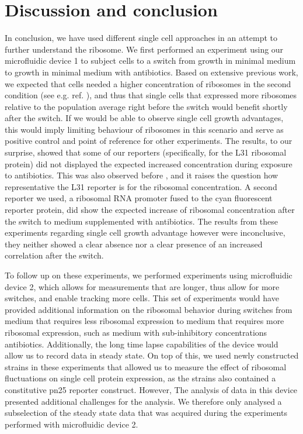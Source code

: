 \section{Discussion and conclusion}

In conclusion, we have used different single cell approaches in an attempt to further understand the ribosome.
%
We first performed an experiment using our microfluidic device 1 to subject cells to a switch from growth in minimal medium to growth in minimal medium with antibiotics.
Based on extensive previous work, we expected that cells needed a higher concentration of ribosomes in the second condition (see e.g. ref. \cite{You2013}), and thus that single cells that expressed more ribosomes relative to the population average right before the switch would benefit shortly after the switch.
%
If we would be able to observe single cell growth advantages, this would imply limiting behaviour of ribosomes in this scenario and serve as positive control and point of reference for other experiments. 
%
The results, to our surprise, showed that some of our reporters (specifically, for the L31 ribosomal protein) did not displayed the expected increased concentration during exposure to antibiotics.
%
This was also observed before \cite{Walker2016t}, and it
raises the question how representative the L31 reporter is for the ribosomal concentration.
%
A second reporter we used, a ribosomal RNA promoter fused to the cyan fluorescent reporter protein, did show the expected increase of ribosomal concentration after the switch to medium supplemented with antibiotics.
%
The results from these experiments regarding single cell growth advantage however were inconclusive, they neither showed a clear absence nor a clear presence of an increased correlation after the switch.



To follow up on these experiments, we performed experiments using microfluidic device 2, which allows for measurements that are longer, thus allow for more switches, and enable tracking more cells. 
%
This set of experiments would have provided additional information on the ribosomal behavior during switches from medium that requires less ribosomal expression to medium that requires more ribosomal expression, such as medium with sub-inhibitory concentrations antibiotics.
Additionally, the long time lapse capabilities of the device would allow us to record data in steady state.
On top of this, we used newly constructed strains in these experiments that allowed us to measure the effect of ribosomal fluctuations on single cell protein expression, as the strains also contained a constitutive pn25 reporter construct.
%
However, The analysis of data in this device presented additional challenges for the analysis.
%
We therefore only analysed a subselection of the steady state data that was acquired during the experiments performed with microfluidic device 2.


